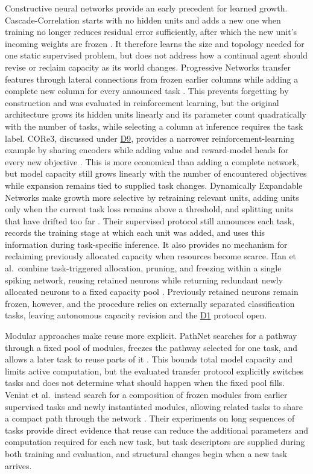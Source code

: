 \documentclass[10pt,journal,compsoc]{IEEEtran}
\DeclareRobustCommand{\Dref}[1]{\hyperref[sec:d#1]{D#1}}
\begin{document}
Constructive neural networks provide an early precedent for learned growth.
Cascade-Correlation starts with no hidden units and adds a new one when training no longer reduces residual error sufficiently, after which the new unit's incoming weights are frozen \cite{fahlman1990}.
It therefore learns the size and topology needed for one static supervised problem, but does not address how a continual agent should revise or reclaim capacity as its world changes.
Progressive Networks transfer features through lateral connections from frozen earlier columns while adding a complete new column for every announced task \cite{rusu2016}.
This prevents forgetting by construction and was evaluated in reinforcement learning, but the original architecture grows its hidden units linearly and its parameter count quadratically with the number of tasks, while selecting a column at inference requires the task label.
CORe3, discussed under \Dref{9}, provides a narrower reinforcement-learning example by sharing encoders while adding value and reward-model heads for every new objective \cite{li2024a}.
This is more economical than adding a complete network, but model capacity still grows linearly with the number of encountered objectives while expansion remains tied to supplied task changes.
Dynamically Expandable Networks make growth more selective by retraining relevant units, adding units only when the current task loss remains above a threshold, and splitting units that have drifted too far \cite{yoon2018}.
Their supervised protocol still announces each task, records the training stage at which each unit was added, and uses this information during task-specific inference.
It also provides no mechanism for reclaiming previously allocated capacity when resources become scarce.
Han et al.\ combine task-triggered allocation, pruning, and freezing within a single spiking network, reusing retained neurons while returning redundant newly allocated neurons to a fixed capacity pool \cite{han2023}.
Previously retained neurons remain frozen, however, and the procedure relies on externally separated classification tasks, leaving autonomous capacity revision and the \Dref{1} protocol open.

Modular approaches make reuse more explicit.
PathNet searches for a pathway through a fixed pool of modules, freezes the pathway selected for one task, and allows a later task to reuse parts of it \cite{fernando2017}.
This bounds total model capacity and limits active computation, but the evaluated transfer protocol explicitly switches tasks and does not determine what should happen when the fixed pool fills.
Veniat et al.\ instead search for a composition of frozen modules from earlier supervised tasks and newly instantiated modules, allowing related tasks to share a compact path through the network \cite{veniat2021}.
Their experiments on long sequences of tasks provide direct evidence that reuse can reduce the additional parameters and computation required for each new task, but task descriptors are supplied during both training and evaluation, and structural changes begin when a new task arrives.
\end{document}
